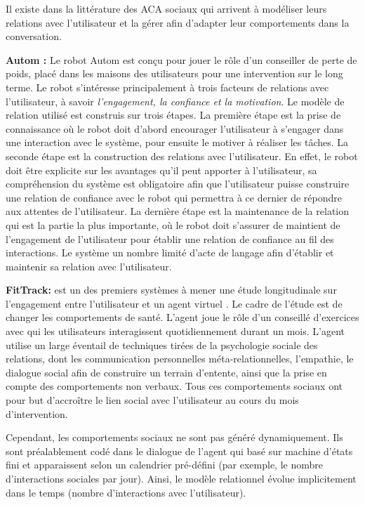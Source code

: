 \documentclass[a4paper,french]{article}
\begin{document}
\par Il existe dans la littérature des  ACA sociaux  qui arrivent à modéliser leurs relations avec l'utilisateur et la gérer afin d'adapter leur comportements dans la conversation.

\par \textbf{Autom :} Le robot Autom \cite{kidd2005sociable} est conçu pour jouer le rôle d'un conseiller de perte de poids, placé dans les maisons des utilisateurs pour une intervention sur le long terme. Le robot s'intéresse principalement à trois facteurs de relations avec l'utilisateur, à savoir \textit{l'engagement, la confiance et la motivation}.  Le modèle de relation utilisé est construis sur trois étapes. La première étape est la prise de connaissance où le robot doit  d'abord encourager l'utilisateur à s'engager dans une interaction avec le système, pour ensuite le motiver à réaliser les tâches.
La seconde étape est la construction des relations avec l'utilisateur. En effet, le robot doit être explicite sur les avantages qu'il peut apporter à l'utilisateur, sa compréhension du système est obligatoire afin que l'utilisateur puisse construire une relation de confiance avec le robot qui permettra à ce dernier de répondre aux attentes de l'utilisateur.  La dernière étape est la maintenance de la relation qui est la partie la plus importante, où le robot doit s'assurer de maintient de l'engagement de l'utilisateur pour établir une relation de confiance au fil des interactions. Le système un nombre limité d'acte de langage afin d'établir et maintenir sa relation avec l'utilisateur.


\par \textbf{FitTrack: } est un des premiers systèmes à mener une étude longitudinale sur l'engagement entre l'utilisateur et un agent virtuel \cite{bickmore2005s}. Le cadre de l'étude est de changer les comportements de santé. L'agent joue le rôle d'un conseillé d'exercices avec qui les utilisateurs interagissent quotidiennement durant un mois. L'agent utilise un large éventail de techniques tirées de la psychologie sociale des relations, dont les communication personnelles méta-relationnelles, l'empathie, le dialogue social afin de construire un terrain d'entente, ainsi que la prise en compte des comportements non verbaux. Tous ces comportements sociaux ont pour but d’accroître le lien social avec l'utilisateur au cours du mois d'intervention.

\par Cependant, les comportements sociaux ne sont pas généré dynamiquement. Ils sont préalablement codé dans le dialogue de l'agent qui basé sur machine d'états fini et apparaissent selon un calendrier pré-défini (par exemple, le nombre d'interactions sociales par jour). Ainsi, le modèle relationnel évolue implicitement dans le temps (nombre d'interactions avec l'utilisateur).
\end{document}
